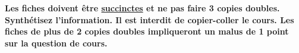 \documentclass[a4paper, 12pt, final, garamond]{book}
\begin{document}
\vspace{-5pt}

\begin{framed}
    \centering\bfseries\large
    Les fiches doivent être \ul{succinctes} et ne pas faire 3 copies doubles.
    Synthétisez l'information. Il est interdit de copier-coller le cours.
    \bigbreak \Huge
    Les fiches de plus de 2 copies doubles impliqueront un malus de 1 point sur
    la question de cours.
\end{framed}
\end{document}
